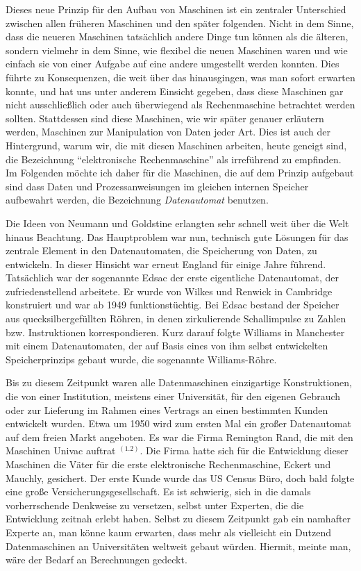 {Dieses neue Prinzip für den Aufbau von Maschinen ist ein zentraler Unterschied zwischen allen früheren Maschinen und den später folgenden. 
Nicht in dem Sinne, dass die neueren Maschinen tatsächlich andere Dinge tun können als die älteren, sondern vielmehr in dem Sinne, wie flexibel die neuen Maschinen waren und wie einfach sie von einer Aufgabe auf eine andere umgestellt werden konnten. Dies führte zu Konsequenzen, die weit über das hinausgingen, was man sofort erwarten konnte, und hat uns unter anderem Einsicht gegeben, dass diese Maschinen gar nicht ausschließlich oder auch überwiegend als Rechenmaschine betrachtet werden sollten. Stattdessen sind diese Maschinen, wie wir später genauer erläutern werden, Maschinen zur Manipulation von Daten jeder Art. Dies ist auch der Hintergrund, warum wir, die mit diesen Maschinen arbeiten, heute geneigt sind, die Bezeichnung \enquote{elektronische Rechenmaschine} als irreführend zu empfinden. Im Folgenden möchte ich daher für die Maschinen,
die auf dem Prinzip aufgebaut sind dass Daten und Prozessanweisungen im gleichen internen Speicher aufbewahrt werden, die Bezeichnung \emph{Datenautomat} benutzen. 

Die Ideen von Neumann und Goldstine erlangten sehr schnell weit über die Welt hinaus Beachtung. Das Hauptproblem war nun, technisch gute Lösungen für das zentrale Element in den Datenautomaten, die Speicherung von Daten, zu entwickeln. In dieser Hinsicht war erneut England für einige Jahre führend. Tatsächlich war der sogenannte Edsac der erste eigentliche Datenautomat, der zufriedenstellend arbeitete. Er wurde von Wilkes und Renwick in Cambridge konstruiert und war ab 1949 funktionstüchtig. Bei Edsac bestand der Speicher aus quecksilbergefüllten Röhren, in denen zirkulierende Schallimpulse zu Zahlen bzw. Instruktionen korrespondieren. Kurz darauf folgte Williams in Manchester mit einem Datenautomaten, der auf Basis eines von ihm selbst entwickelten Speicherprinzips gebaut wurde, die sogenannte Williams-Röhre.

Bis zu diesem Zeitpunkt waren alle Datenmaschinen einzigartige Konstruktionen, die von einer Institution, meistens einer Universität, für den eigenen Gebrauch oder zur Lieferung im Rahmen eines Vertrags an einen bestimmten Kunden entwickelt wurden. Etwa um 1950 wird zum ersten Mal ein großer Datenautomat auf dem freien Markt angeboten. Es war die Firma Remington Rand, die mit den Maschinen Univac auftrat $^{(1.2)}$. Die Firma hatte sich für die Entwicklung dieser Maschinen die Väter für die erste elektronische Rechenmaschine, Eckert und Mauchly, gesichert.
Der erste Kunde wurde das US Census Büro, doch bald folgte eine große Versicherungsgesellschaft. Es ist schwierig, sich in die damals vorherrschende Denkweise zu versetzen, selbst unter Experten, die die Entwicklung zeitnah erlebt haben. Selbst zu diesem Zeitpunkt gab ein namhafter Experte an, man könne kaum erwarten, dass mehr als vielleicht ein Dutzend Datenmaschinen an Universitäten weltweit gebaut würden. Hiermit, meinte man, wäre der Bedarf an Berechnungen gedeckt.

}
